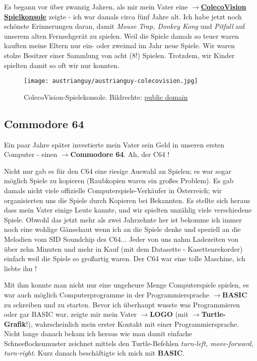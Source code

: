 Es begann vor über zwanzig Jahren, als mir mein Vater eine \href{https://de.wikipedia.org/wiki/Colecovision}{\textbf{$\rightarrow$ColecoVision Spielkonsole}} 
zeigte - ich war damals circa fünf Jahre alt. Ich habe jetzt noch schönste Erinnerungen daran, damit \textit{Mouse Trap, Donkey Kong} und \textit{Pitfall} auf unserem alten Fernsehgerät zu spielen. Weil die Spiele damals so teuer waren kauften meine Eltern nur ein- oder zweimal im Jahr neue Spiele. Wir waren stolze Besitzer einer Sammlung von acht (8!) Spielen. Trotzdem, wir Kinder spielten damit so oft wir nur konnten.
\begin{figure}
\texttt{[image: austrianguy/austrianguy-colecovision.jpg]}\\
\caption{ColecoVision-Spielekonsole. Bildrechte: \href{https://commons.wikimedia.org/wiki/File:Coleco-vision-console.jpg}{public domain}}
\end{figure}

\subsection*{Commodore 64}

Ein paar Jahre später investierte mein Vater sein Geld in unseren ersten Computer - einen \textbf{$\rightarrow$Commodore 64}. Ah, der C64 !

Nicht nur gab es für den C64 eine riesige Auswahl an Spielen; es war sogar möglich Spiele zu kopieren (Raubkopien waren ein großes Problem). Es gab damals nicht viele offizielle Computerspiele-Verkäufer in Österreich; wir organisierten uns die Spiele durch Kopieren bei Bekannten.  Es stellte sich heraus dass mein Vater einige Leute kannte, und wir spielten unzählig viele verschiedene Spiele. Obwohl das jetzt mehr als zwei Jahrzehnte her ist bekomme ich immer noch eine wohlige Gänsehaut wenn ich an die Spiele denke und speziell an die Melodien vom SID Soundchip des C64...  Jeder von uns nahm Ladezeiten von über zehn Minuten und mehr in Kauf (mit dem Datasette - Kasettenrekorder) einfach weil die Spiele so großartig waren. Der C64 war eine tolle Maschine, ich liebte ihn !

Mit ihm konnte man nicht nur eine ungeheure Menge Computerspiele spielen, es war auch möglich Computerprogramme in der Programmiersprache \textbf{$\rightarrow$BASIC} zu schreiben und zu starten. Bevor ich überhaupt wusste was Programmieren oder gar BASIC war, zeigte mir mein Vater \textbf{$\rightarrow$LOGO} (mit \textbf{$\rightarrow$Turtle-Grafik}!), wahrscheinlich mein erster Kontakt mit einer Programmiersprache. Nicht lange danach bekam ich heraus wie man damit einfache Schneeflockenmuster zeichnet mittels den Turtle-Befehlen \textit{turn-left, move-forward, turn-right}. Kurz danach beschäftigte ich mich mit \textbf{BASIC}.

